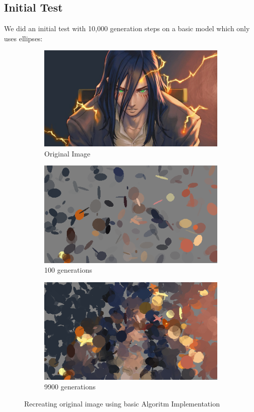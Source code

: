 \documentclass[10pt, conference]{IEEEtran}
\begin{document}
\subsection*{
	Initial Test
}
We did an initial test with 10,000 generation steps on a basic model which only uses ellipses:
\begin{figure}[h!]
	\centering
	\begin{subfigure}{0.4\linewidth}
		\centering
		\includegraphics[width=\linewidth]{eren orig.png}
		\caption{Original Image}
	\end{subfigure}%
	\hfill
	\begin{subfigure}{0.4\linewidth}
		\centering
		\includegraphics[width=\linewidth]{generated_100.png}
		\caption{100 generations}
	\end{subfigure}
	\begin{subfigure}{0.4\linewidth}
		\centering
		\includegraphics[width=\linewidth]{generated_9900.png}
		\caption{9900 generations}
	\end{subfigure}
	\caption{Recreating original image using basic Algoritm Implementation}
\end{figure}
\end{document}
